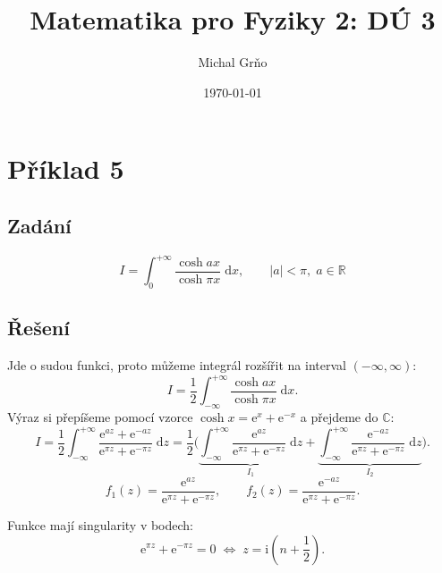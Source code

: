 \documentclass[10pt,a4paper]{article}
\newcommand{\const}[1]{\text{#1}}
\renewcommand{\d}[1]{\;\const{d}#1}
\newcommand{\e}[1]{\const{e}^{#1}}
\renewcommand{\i}{\const{i}}
\begin{document}
\title{Matematika pro Fyziky 2: DÚ 3}
\author{Michal Grňo}
\date{\today}

\maketitle

\section{Příklad 5}
\subsection{Zadání}
\begin{equation*}
    I = \int_0^{+\infty}\frac{\cosh ax}{\cosh \pi x} \d{x},
    \hspace{2em}
    |a|<\pi, \; a \in \mathbb{R}
\end{equation*}

\subsection{Řešení}
Jde o sudou funkci, proto můžeme integrál rozšířit na interval $(-\infty, \infty)$:
\begin{equation*}
    I = \frac{1}{2} \int_{-\infty}^{+\infty}\frac{\cosh ax}{\cosh \pi x} \d{x}.
\end{equation*}
Výraz si přepíšeme pomocí vzorce $\cosh x = \e{x} + \e{-x}$ a přejdeme do $\mathbb{C}$:
\begin{equation*}
    I = \frac{1}{2} \int_{-\infty}^{+\infty}\frac{\e{az} + \e{-az}}{\e{\pi z} + \e{-\pi z}} \d{z}
    = \frac{1}{2} \Big( \underbrace{\int_{-\infty}^{+\infty}\frac{\e{az}}{\e{\pi z} + \e{-\pi z}} \d{z}}_{I_1} + \underbrace{\int_{-\infty}^{+\infty}\frac{\e{-az}}{\e{\pi z} + \e{-\pi z}} \d{z}}_{I_2} \Big).
\end{equation*}
\begin{equation*}
    f_1(z) = \frac{\e{az}}{\e{\pi z} + \e{-\pi z}},
    \hspace{2em}
    f_2(z) = \frac{\e{-az}}{\e{\pi z} + \e{-\pi z}}.
\end{equation*}

Funkce mají singularity v bodech:
\begin{equation*}
    \e{\pi z} + \e{-\pi z} = 0 \; \Leftrightarrow \; z = \i (n + \frac{1}{2}).
\end{equation*}
\end{document}
